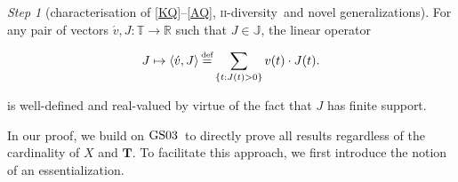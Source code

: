 \documentclass[ecta,nameyear,draft]{econsocart}
\newcommand{\countof}{\mathbin{\#}\hskip1pt}
\newcommand{\R}{\mathbb R}
\newcommand\defeq{\mathrel{\overset{\makebox[0pt]{\mbox{\normalfont\tiny def}}}{=}}}%
\newcommand{\mbbt}{{\mathbf {T}}}
\newcommand{\mbbtpp}{{\mathds{T}}}
\newcommand{\mbbjpp}{\mathds{J}}
\newcommand{\twodiv}{\textsc{ii}-\textup{diversity}}
\newcommand{\gsii}{$\textup{GS03}$}
\theoremstyle{plain}
\theoremstyle{remark}
\newtheorem{step}{Step}[section]
\begin{document}
\begin{appendix}
    \begin{step}[characterisation of \ref{KQ}–\ref{AQ}, \twodiv\ and novel
      generalizations]\label{step-twodiv}
    For any pair of vectors $\acute v, J: \mbbtpp \rightarrow \R$ such that $J
    \in \mbbjpp$, the linear operator
    \begin{linenomath*}
      \begin{equation*}
        J \mapsto \langle \acute v, J \rangle \defeq \sum_{\{t : J(t) > 0\}} v(t)
        \cdot J(t).
      \end{equation*}
    \end{linenomath*}
    is well-defined and real-valued by virtue of the fact that $J$ has finite
    support.

    In our proof, we build on \gsii\ to directly prove all results regardless of
    the cardinality of $X$ and $\mbbt$. To facilitate this approach, we first 
    introduce the notion of an essentialization.


\end{step}
\end{appendix}
\end{document}
